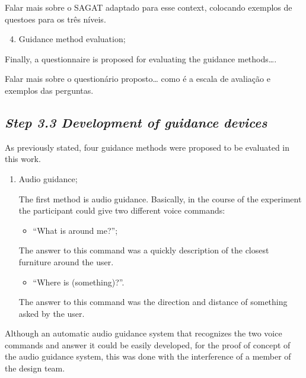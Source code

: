        Falar mais sobre o SAGAT adaptado para esse context, colocando exemplos de questoes para os três níveis.

        \begin{enumerate} [label = \Alph*)]
            \setcounter{enumi}{3}
            \item Guidance method evaluation;
        \end{enumerate}

        Finally, a questionnaire is proposed for evaluating the guidance methods….

        Falar mais sobre o questionário proposto… como é a escala de avaliação e exemplos das perguntas.
        
    \subsection*{\textit{Step 3.3 Development of guidance devices}}

        As previously stated, four guidance methods were proposed to be evaluated in this work.
        
        \begin{enumerate} [label = \Alph*)]
            \item Audio guidance;
            
            The first method is audio guidance. Basically, in the course of the experiment the participant could give two different voice commands:

            \begin{itemize} [label = --]
                \item “What is around me?”;
            \end{itemize}

            The answer to this command was a quickly description of the closest furniture around the user.

            \begin{itemize} [label = --]
                \item “Where is (something)?”.
            \end{itemize}

            The answer to this command was the direction and distance of something asked by the user.

        \end{enumerate}

        Although an automatic audio guidance system that recognizes the two voice commands and answer it could be easily developed, for the proof of concept of the audio guidance system, this was done with the interference of a member of the design team.

